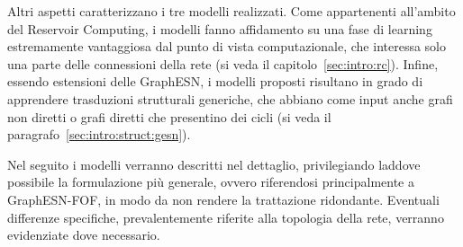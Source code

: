 Altri aspetti caratterizzano i tre modelli realizzati.
Come appartenenti all'ambito del Reservoir Computing, i modelli fanno affidamento su una fase di learning estremamente vantaggiosa dal punto di vista computazionale, che interessa solo una parte delle connessioni della rete (si veda il capitolo~\ref{sec:intro:rc}). 
Infine, essendo estensioni delle GraphESN, i modelli proposti risultano in grado di apprendere trasduzioni strutturali generiche, che abbiano come input anche grafi non diretti o grafi diretti che presentino dei cicli (si veda il paragrafo~\ref{sec:intro:struct:gesn}).

Nel seguito i modelli verranno descritti nel dettaglio, privilegiando laddove possibile la formulazione più generale, ovvero riferendosi principalmente a GraphESN-FOF, in modo da non rendere la trattazione ridondante. Eventuali differenze specifiche, prevalentemente riferite alla topologia della rete, verranno evidenziate dove necessario.



